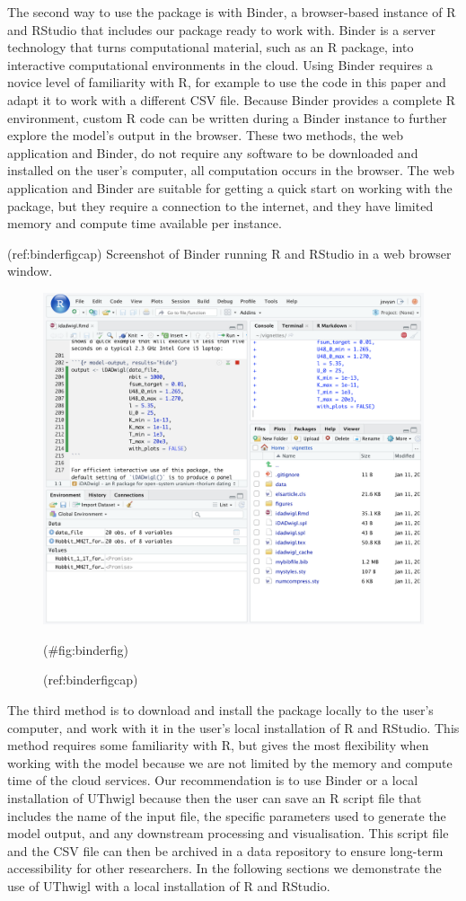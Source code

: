 \documentclass[]{elsarticle} %
\begin{document}
The second way to use the package is with Binder, a browser-based instance of R and RStudio that includes our package ready to work with. Binder is a server technology that turns computational material, such as an R package, into interactive computational environments in the cloud. Using Binder requires a novice level of familiarity with R, for example to use the code in this paper and adapt it to work with a different CSV file. Because Binder provides a complete R environment, custom R code can be written during a Binder instance to further explore the model's output in the browser. These two methods, the web application and Binder, do not require any software to be downloaded and installed on the user's computer, all computation occurs in the browser. The web application and Binder are suitable for getting a quick start on working with the package, but they require a connection to the internet, and they have limited memory and compute time available per instance.

(ref:binderfigcap) Screenshot of Binder running R and RStudio in a web browser window.

\begin{figure}
\includegraphics[width=0.95\linewidth]{figures/binder} \caption{(ref:binderfigcap)}(\#fig:binderfig)
\end{figure}

The third method is to download and install the package locally to the user's computer, and work with it in the user's local installation of R and RStudio. This method requires some familiarity with R, but gives the most flexibility when working with the model because we are not limited by the memory and compute time of the cloud services. Our recommendation is to use Binder or a local installation of UThwigl because then the user can save an R script file that includes the name of the input file, the specific parameters used to generate the model output, and any downstream processing and visualisation. This script file and the CSV file can then be archived in a data repository to ensure long-term accessibility for other researchers. In the following sections we demonstrate the use of UThwigl with a local installation of R and RStudio.
\end{document}
